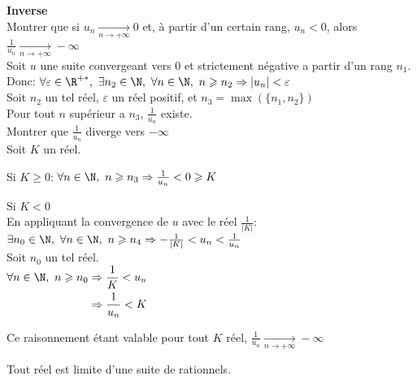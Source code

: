 \documentclass[12pt,twoside,a4paper]{article}
\begin{document}
		\begin{preuve}
			\textbf{Inverse}\\
			Montrer que si $u_n\mathop{\longrightarrow}\limits_{n\rightarrow+\infty}0$ et, \`a partir d'un certain rang, $u_n<0$, alors $\frac{1}{u_n}\mathop{\longrightarrow}\limits_{n\rightarrow+\infty}-\infty$\\
			Soit $u$ une suite convergeant vers $0$ et strictement n\'egative a partir d'un rang $n_1$.\\
			Donc: $\forall\varepsilon\in\R^{+*},\ \exists n_2\in\N,\ \forall n\in\N,\ n\geqslant n_2\Rightarrow|u_n|<\varepsilon$\\
			Soit $n_2$ un tel r\'eel, $\varepsilon$ un r\'eel positif, et $n_3=\max(\{n_1,n_2\})$\\
			Pour tout $n$ sup\'erieur a $n_3$, $\frac{1}{u_n}$ existe.\\
			Montrer que $\frac{1}{u_n}$ diverge vers $-\infty$\\
			Soit $K$ un r\'eel.
			\begin{liste}
				\item Si $K\geqslant0$: $\forall n\in\N,\ n\geqslant n_3\Rightarrow \frac1{u_n}<0\geqslant K$
				\item Si $K<0$\\
					En appliquant la convergence de $u$ avec le r\'eel $\frac1{|K|}$:\\
					$\exists n_0\in\N,\ \forall n\in\N,\ n\geqslant n_4\Rightarrow -\frac1{|K|}<u_n<\frac1{u_n}$\\
					Soit $n_0$ un tel r\'eel.\\
					$\begin{aligned}
						\forall n\in\N,\ n\geqslant n_0&\Rightarrow \frac1{K}<u_n\\
							&\Rightarrow \frac{1}{u_n}<K
					\end{aligned}$
			\end{liste}
			Ce raisonnement \'etant valable pour tout $K$ r\'eel, $\frac1{u_n}\mathop{\longrightarrow}\limits_{n\rightarrow+\infty}-\infty$
		\end{preuve}
		\begin{prop}
			Tout r\'eel est limite d'une suite de rationnels.
		\end{prop}
\end{document}

